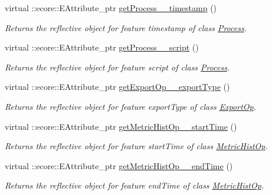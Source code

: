 \begin{DoxyCompactItemize}
virtual ::ecore::EAttribute\_\-ptr \hyperlink{classIMS__Data_1_1IMS__DataPackage_a241a9958f80e00ce617936d08cf2e566}{getProcess\_\-\_\-timestamp} ()
\begin{DoxyCompactList}\small\item\em Returns the reflective object for feature timestamp of class \hyperlink{classIMS__Data_1_1Process}{Process}. \item\end{DoxyCompactList}\item 
virtual ::ecore::EAttribute\_\-ptr \hyperlink{classIMS__Data_1_1IMS__DataPackage_aa7a7830b69f9102ad2e154e9405d7034}{getProcess\_\-\_\-script} ()
\begin{DoxyCompactList}\small\item\em Returns the reflective object for feature script of class \hyperlink{classIMS__Data_1_1Process}{Process}. \item\end{DoxyCompactList}\item 
virtual ::ecore::EAttribute\_\-ptr \hyperlink{classIMS__Data_1_1IMS__DataPackage_a693632907e55831d380c4a71fbe16d35}{getExportOp\_\-\_\-exportType} ()
\begin{DoxyCompactList}\small\item\em Returns the reflective object for feature exportType of class \hyperlink{classIMS__Data_1_1ExportOp}{ExportOp}. \item\end{DoxyCompactList}\item 
virtual ::ecore::EAttribute\_\-ptr \hyperlink{classIMS__Data_1_1IMS__DataPackage_aee181e52cfa50fcf72c0522818a5e2c9}{getMetricHistOp\_\-\_\-startTime} ()
\begin{DoxyCompactList}\small\item\em Returns the reflective object for feature startTime of class \hyperlink{classIMS__Data_1_1MetricHistOp}{MetricHistOp}. \item\end{DoxyCompactList}\item 
virtual ::ecore::EAttribute\_\-ptr \hyperlink{classIMS__Data_1_1IMS__DataPackage_a1c6f54b4af483bac3a0264e68be9f4f1}{getMetricHistOp\_\-\_\-endTime} ()
\begin{DoxyCompactList}\small\item\em Returns the reflective object for feature endTime of class \hyperlink{classIMS__Data_1_1MetricHistOp}{MetricHistOp}. \item\end{DoxyCompactList}\item 

\end{DoxyCompactItemize}
